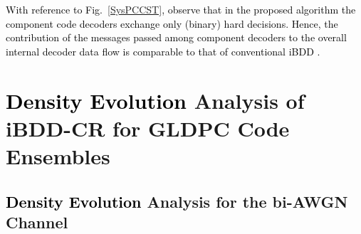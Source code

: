 \documentclass[journal]{IEEEtran}
\newcommand{\SH}{\textcolor{black}}
\newcommand{\GL}{\textcolor{black}}
\newcommand{\AG}{\textcolor{black}}
\newcommand{\GLC}[1]{\textcolor{black}{\textbf{\textit{#1}}}}
\begin{document}
\GL{With reference to Fig.~\ref{SysPCCST}, observe that in the proposed algorithm the component code decoders exchange only \SH{(binary)} hard decisions. Hence, the contribution of the messages passed among component  decoders to the overall internal decoder data flow} \GL{is comparable to that of conventional iBDD \cite[Sec.~III.A]{staircase_frank}.} 


\section{\AG{Density Evolution} Analysis of iBDD-CR for GLDPC Code Ensembles}\label{sec:DE_PCs}

\subsection{\AG{Density Evolution} Analysis for the bi-AWGN Channel}\label{sec:DE_BIAWGN}
\end{document}
